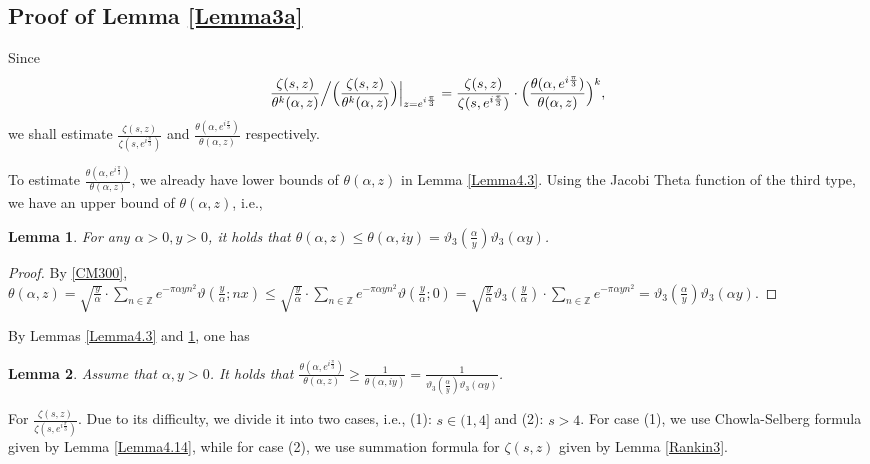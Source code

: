 \documentclass[reqno,english]{amsart}
\newtheorem{lemma}{Lemma}[section]
\newtheorem{open problem}{Open Problem}[section]
\newtheorem{open question}{Open Question}[section]
\newtheorem{open questions on hexagonal lattice}{Open Questions on hexagonal lattice}[section]
\begin{document}
\subsection{Proof of Lemma \ref{Lemma3a}}

Since
\begin{equation}\aligned\nonumber
\frac{\zeta(s,z)}{\theta^k(\alpha,z)}
\Big/\Big(\frac{\zeta(s,z)}{\theta^k(\alpha,z)}\Big)\Big|_{z=e^{i\frac{\pi}{3}}}
=
\frac{\zeta(s,z)}{\zeta(s,e^{i\frac{\pi}{3}})}\cdot\Big(\frac{\theta(\alpha,e^{i\frac{\pi}{3}})}{\theta(\alpha,z)}\Big)^{k},
 \endaligned\end{equation}
we shall estimate $\frac{\zeta(s,z)}{\zeta(s,e^{i\frac{\pi}{3}})}$ and $\frac{\theta(\alpha,e^{i\frac{\pi}{3}})}{\theta(\alpha,z)}$
respectively.

 To estimate $\frac{\theta(\alpha,e^{i\frac{\pi}{3}})}{\theta(\alpha,z)}$, we already have lower bounds of $\theta(\alpha,z)$
in Lemma \ref{Lemma4.3}.
Using the Jacobi Theta function of the third type, we have an upper bound of $\theta(\alpha,z)$, i.e.,

\begin{lemma}\label{Lemma4.21}
For any $\alpha>0, y>0$, it holds that $\theta(\alpha,z)\leq\theta(\alpha,iy)=\vartheta_3(\frac{\alpha}{y})\vartheta_3(\alpha y)$.

\end{lemma}
\begin{proof} By \eqref{CM300}, $\theta(\alpha,z)=\sqrt{\frac{y}{\alpha}}\cdot\sum_{n\in\mathbb{Z}} e^{-\pi\alpha yn^2}\vartheta(\frac{y}{\alpha};nx)\leq\sqrt{\frac{y}{\alpha}}\cdot\sum_{n\in\mathbb{Z}} e^{-\pi\alpha yn^2}\vartheta(\frac{y}{\alpha};0)=\sqrt{\frac{y}{\alpha}}\vartheta_3(\frac{y}{\alpha})\cdot\sum_{n\in\mathbb{Z}} e^{-\pi\alpha yn^2}=\vartheta_3(\frac{\alpha}{y})\vartheta_3(\alpha y)$.
\end{proof}

By Lemmas \ref{Lemma4.3} and \ref{Lemma4.21}, one has

\begin{lemma}\label{Lemma4a} Assume that $\alpha, y>0$. It holds that $\frac{\theta(\alpha,e^{i\frac{\pi}{3}})}{\theta(\alpha,z)}\geq\frac{1}{\theta(\alpha,iy)}=
     \frac{1}{\vartheta_3(\frac{\alpha}{y})\vartheta_3(\alpha y)}$.


\end{lemma}



For $\frac{\zeta(s,z)}{\zeta(s,e^{i\frac{\pi}{3}})}$. Due to its difficulty, we divide it into two cases, i.e., (1): $s\in(1,4]$ and
(2): $s>4$. For case (1), we use Chowla-Selberg formula given by Lemma \ref{Lemma4.14}, while for case (2), we use
summation formula for $\zeta(s,z)$ given by Lemma \ref{Rankin3}.
\end{document}
